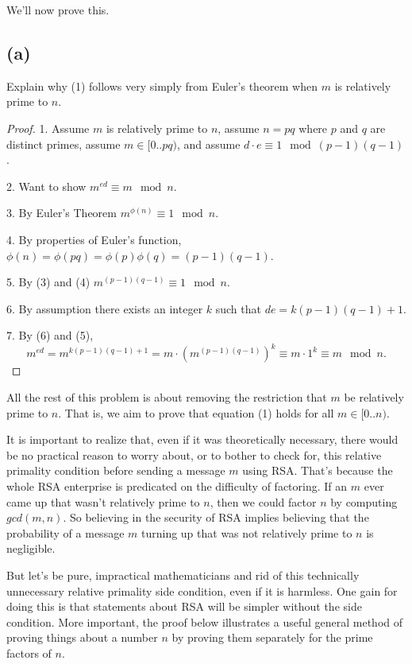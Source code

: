 \documentclass[14pt]{extarticle}
\begin{document}
We’ll now prove this.

\subsection{(a)}
Explain why (1) follows very simply from Euler's theorem when $m$ is relatively prime to $n$.
\begin{proof}
1. Assume $m$ is relatively prime to $n$, assume $n = pq$ where $p$ and $q$ are distinct primes, assume $m \in [0..pq)$, and assume $d \cdot e \equiv 1 \mod (p - 1)(q - 1)$.

2. Want to show $m^{ed} \equiv m \mod n$.

3. By Euler's Theorem $m^{\phi(n)} \equiv 1 \mod n$.

4. By properties of Euler's function, $\phi(n) = \phi(pq) = \phi(p)\phi(q) = (p-1)(q-1)$.

5. By (3) and (4) $m^{(p-1)(q-1)} \equiv 1 \mod n$.

6. By assumption there exists an integer $k$ such that $de = k(p-1)(q-1) + 1$.

7. By (6) and (5),
$$
m^{ed} = m^{k(p-1)(q-1) + 1} = m \cdot (m^{(p-1)(q-1)})^{k} \equiv m \cdot 1^k \equiv m \mod n.
$$
\end{proof}

All the rest of this problem is about removing the restriction that $m$ be relatively prime to $n$. That is, we aim to prove that equation (1) holds for all $m \in [0..n)$.

It is important to realize that, even if it was theoretically necessary, there would be no practical reason to worry about, or to bother to check for, this relative primality condition before sending a message $m$ using RSA. That’s because the whole RSA enterprise is predicated on the difficulty of factoring. If an $m$ ever came up that wasn’t relatively prime to $n$, then we could factor $n$ by computing $gcd(m,n)$. So believing in the security of RSA implies believing that the probability of a message $m$ turning up that was not relatively prime to $n$ is negligible.

But let's be pure, impractical mathematicians and rid of this technically unnecessary relative primality side condition, even if it is harmless. One gain for doing this is that statements about RSA will be simpler without the side condition. More important, the proof below illustrates a useful general method of proving things about a number $n$ by proving them separately for the prime factors of $n$.
\end{document}
